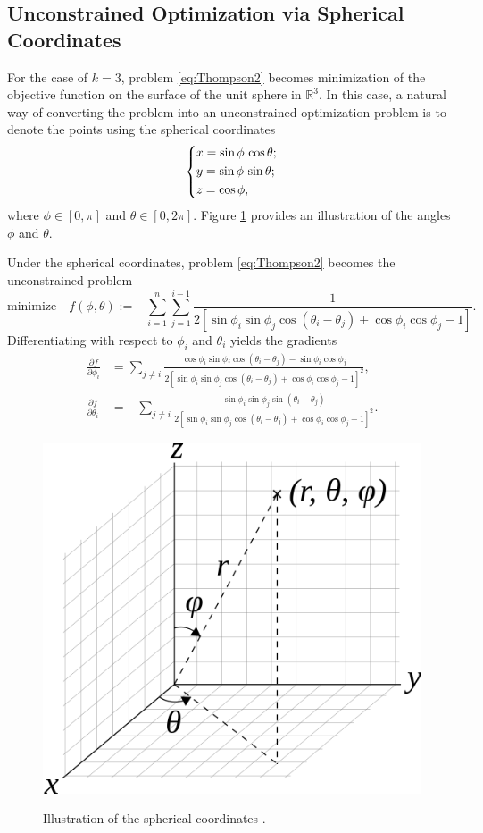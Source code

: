 \documentclass[11pt]{article}
\begin{document}

\subsection{Unconstrained Optimization via Spherical Coordinates}\label{sec:Sphere}

For the case of $k=3$, problem \eqref{eq:Thompson2} becomes minimization of the objective function on the surface of the unit sphere in $\mathbb{R}^3$.
In this case, a natural way of converting the problem into an unconstrained optimization problem is to denote the points using the spherical coordinates
\begin{equation*}
\begin{dcases}
x = \sin\phi\,\cos\theta; \\
y = \sin\phi\,\sin\theta; \\
z = \cos\phi,
\end{dcases}
\end{equation*}
where $\phi\in[0,\pi]$ and $\theta\in[0,2\pi]$. Figure \ref{fig:Spherical} provides an illustration of the angles $\phi$ and $\theta$. 

Under the spherical coordinates, problem \eqref{eq:Thompson2} becomes the unconstrained problem
\begin{equation}\label{eq:Sphere}
\text{minimize}\quad f(\phi, \theta) := -\sum_{i=1}^n\sum_{j=1}^{i-1}\frac{1}{2[\sin\phi_i\sin\phi_j\cos(\theta_i-\theta_j) + \cos\phi_i\cos\phi_j-1]}.
\end{equation}
Differentiating with respect to $\phi_i$ and $\theta_i$ yields the gradients
\begin{align}
\frac{\partial f}{\partial \phi_i} & = \sum_{j\neq i}\frac{\cos\phi_i\sin\phi_j\cos(\theta_i-\theta_j)-\sin\phi_i\cos\phi_j}{2[\sin\phi_i\sin\phi_j\cos(\theta_i-\theta_j) + \cos\phi_i\cos\phi_j-1]^2}, \\
\frac{\partial f}{\partial \theta_i} & = -\sum_{j\neq i}\frac{\sin\phi_i\sin\phi_j\sin(\theta_i-\theta_j)}{2[\sin\phi_i\sin\phi_j\cos(\theta_i-\theta_j) + \cos\phi_i\cos\phi_j-1]^2}.
\end{align} 

\begin{figure}[!htb]
  \centering
  \includegraphics[width=0.3\columnwidth]{Spherical}\\
  \caption{Illustration of the spherical coordinates \cite{WikiSphere}.}
  \label{fig:Spherical}
\end{figure}
\end{document}
